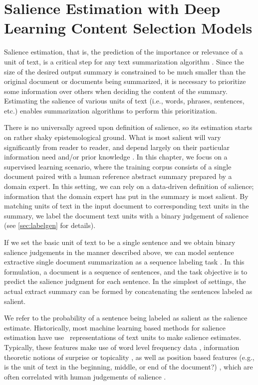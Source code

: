 \chapter{Salience Estimation with Deep Learning Content Selection Models}
\label{ch:dlsum}

\startglyph Salience estimation, that is, the prediction of the importance or
relevance of a unit of text, is a critical step for any text summarization
algorithm \citep{nenkova2011}. Since the size of the desired output summary is
constrained to be much smaller than the original document or documents being
summarized, it is necessary to prioritize some information over others when
deciding the content of  the summary. Estimating the salience of various units
of text (i.e., words, phrases, sentences, etc.) enables summarization
algorithms to perform this prioritization.

There is no universally agreed upon definition of salience, so its estimation
starts on rather shaky epistemological ground. What is most salient will vary
significantly from reader to reader, and depend largely on their particular
information need and/or prior knowledge \citep{jones1999}.  In this chapter, we
focus on a supervised learning scenario, where the training corpus consists of
a single document paired with a human reference abstract summary prepared by a
domain expert. In this setting,  we can rely on a data-driven definition of
salience; information that the domain expert has put in the summary is most
salient.  By matching units of text in the input document to corresponding text
units in the summary, we label the document text units with a binary judgement
of salience (see \autoref{sec:labelgen} for details). 

If we set the basic unit of text to be a single sentence and we obtain binary
salience judgements in the manner described above, we can model sentence
extractive single document summarization as a sequence labeling task
\citep{conroy2001}. In this formulation, a document is a sequence of sentences,
and the task objective is to predict the salience judgment for each sentence.
In the simplest of settings, the actual extract summary can be formed by
concatenating the sentences labeled as salient.

We refer to the probability of a sentence being labeled as salient as the
salience estimate.  Historically, most machine learning based methods for
salience estimation have use \featurebased~representations of text units to
make salience estimates. Typically, these features make use of word level
frequency data \citep{nenkova2005}, information theoretic notions of surprise
or topicality \citep{lin2000,daume2006,louis2013,louis2014}, as well as
position based features (e.g., is the unit of text in the beginning, middle, or
end of the document?) \citep{kupiec1995trainable,radev2000,conroy2001}, which
are often correlated with human judgements of salience \citep{nenkova2005b}.

